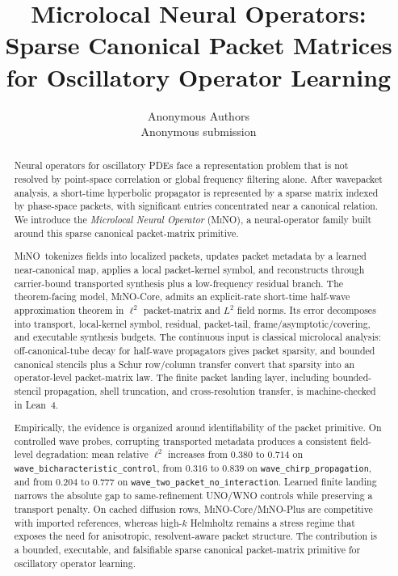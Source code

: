 \documentclass[twoside,11pt]{article}
\newcommand{\MinoTitle}{Microlocal Neural Operators: Sparse Canonical Packet Matrices for Oscillatory Operator Learning}
\newcommand{\MinoAuthorBlock}{\name Anonymous Authors \\
\addr Anonymous submission
}
\newcommand{\MiNO}{\textsc{MiNO}}
\begin{document}
\title{\MinoTitle}
\author{\MinoAuthorBlock}
\maketitle

\begin{abstract}
Neural operators for oscillatory PDEs face a representation problem that is not resolved by point-space correlation or global frequency filtering alone.  After wavepacket analysis, a short-time hyperbolic propagator is represented by a sparse matrix indexed by phase-space packets, with significant entries concentrated near a canonical relation.  We introduce the \emph{Microlocal Neural Operator} (\MiNO), a neural-operator family built around this sparse canonical packet-matrix primitive.

\MiNO\ tokenizes fields into localized packets, updates packet metadata by a learned near-canonical map, applies a local packet-kernel symbol, and reconstructs through carrier-bound transported synthesis plus a low-frequency residual branch.  The theorem-facing model, \MiNO-Core, admits an explicit-rate short-time half-wave approximation theorem in $\ell^2$ packet-matrix and $L^2$ field norms.  Its error decomposes into transport, local-kernel symbol, residual, packet-tail, frame/asymptotic/covering, and executable synthesis budgets.  The continuous input is classical microlocal analysis: off-canonical-tube decay for half-wave propagators gives packet sparsity, and bounded canonical stencils plus a Schur row/column transfer convert that sparsity into an operator-level packet-matrix law.  The finite packet landing layer, including bounded-stencil propagation, shell truncation, and cross-resolution transfer, is machine-checked in Lean~4.

Empirically, the evidence is organized around identifiability of the packet primitive.  On controlled wave probes, corrupting transported metadata produces a consistent field-level degradation: mean relative $\ell^2$ increases from $0.380$ to $0.714$ on \texttt{wave\_bicharacteristic\_control}, from $0.316$ to $0.839$ on \texttt{wave\_chirp\_propagation}, and from $0.204$ to $0.777$ on \texttt{wave\_two\_packet\_no\_interaction}.  Learned finite landing narrows the absolute gap to same-refinement UNO/WNO controls while preserving a transport penalty.  On cached diffusion rows, \MiNO-Core/\MiNO-Plus are competitive with imported references, whereas high-$k$ Helmholtz remains a stress regime that exposes the need for anisotropic, resolvent-aware packet structure.  The contribution is a bounded, executable, and falsifiable sparse canonical packet-matrix primitive for oscillatory operator learning.
\end{abstract}
\end{document}
